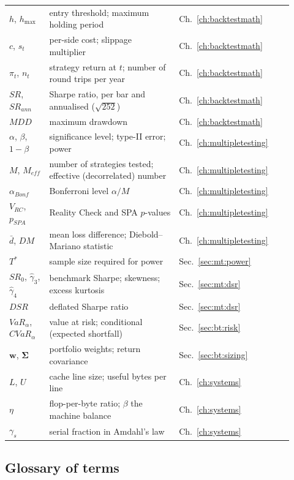 \begin{center}
\begin{tabular}{p{0.13\linewidth}p{0.42\linewidth}p{0.37\linewidth}}
$h$, $h_{\max}$ & entry threshold; maximum holding period & Ch.~\ref{ch:backtestmath} \\
$c$, $s_t$ & per-side cost; slippage multiplier & Ch.~\ref{ch:backtestmath} \\
$\pi_t$, $n_t$ & strategy return at $t$; number of round trips per year & Ch.~\ref{ch:backtestmath} \\
$SR$, $SR_{ann}$ & Sharpe ratio, per bar and annualised ($\sqrt{252}$) & Ch.~\ref{ch:backtestmath} \\
$MDD$ & maximum drawdown & Ch.~\ref{ch:backtestmath} \\
$\alpha$, $\beta$, $1-\beta$ & significance level; type-II error; power & Ch.~\ref{ch:multipletesting} \\
$M$, $M_{eff}$ & number of strategies tested; effective (decorrelated) number & Ch.~\ref{ch:multipletesting} \\
$\alpha_{Bonf}$ & Bonferroni level $\alpha/M$ & Ch.~\ref{ch:multipletesting} \\
$V_{RC}$, $p_{SPA}$ & Reality Check and SPA $p$-values & Ch.~\ref{ch:multipletesting} \\
$\bar d$, $DM$ & mean loss difference; Diebold--Mariano statistic & Ch.~\ref{ch:multipletesting} \\
$T^*$ & sample size required for power & Sec.~\ref{sec:mt:power} \\
$SR_0$, $\hat\gamma_3$, $\hat\gamma_4$ & benchmark Sharpe; skewness; excess kurtosis & Sec.~\ref{sec:mt:dsr} \\
$DSR$ & deflated Sharpe ratio & Sec.~\ref{sec:mt:dsr} \\
$VaR_\alpha$, $CVaR_\alpha$ & value at risk; conditional (expected shortfall) & Sec.~\ref{sec:bt:risk} \\
$\mathbf{w}$, $\boldsymbol\Sigma$ & portfolio weights; return covariance & Sec.~\ref{sec:bt:sizing} \\
$L$, $U$ & cache line size; useful bytes per line & Ch.~\ref{ch:systems} \\
$\eta$ & flop-per-byte ratio; $\beta$ the machine balance & Ch.~\ref{ch:systems} \\
$\gamma_s$ & serial fraction in Amdahl's law & Ch.~\ref{ch:systems} \\
\bottomrule
\end{tabular}
\end{center}

\subsection{Glossary of terms}

